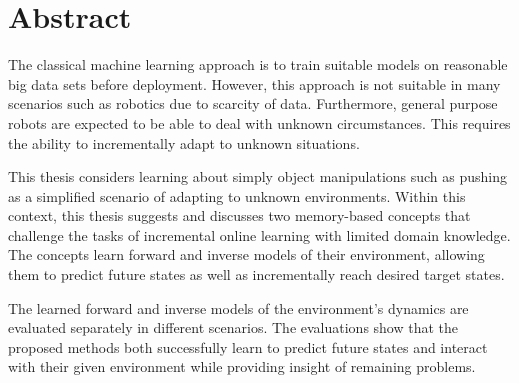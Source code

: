 



\chapter*{\enskip Abstract}

The classical machine learning approach is to train suitable models on reasonable big data sets before deployment. However, this approach is not suitable in many scenarios such as robotics due to scarcity of data. Furthermore, general purpose robots are expected to be able to deal with unknown circumstances. This requires the ability to incrementally adapt to unknown situations.

This thesis considers learning about simply object manipulations such as pushing as a simplified scenario of adapting to unknown environments.
Within this context, this thesis suggests and discusses two memory-based concepts that challenge the tasks of incremental online learning with limited domain knowledge.
The concepts learn forward and inverse models of their environment, allowing them to predict future states as well as incrementally reach desired target states.

The learned forward and inverse models of the environment's dynamics are evaluated separately in different scenarios.
The evaluations show that the proposed methods both successfully learn to predict future states and interact with their given environment while providing insight of remaining problems.


